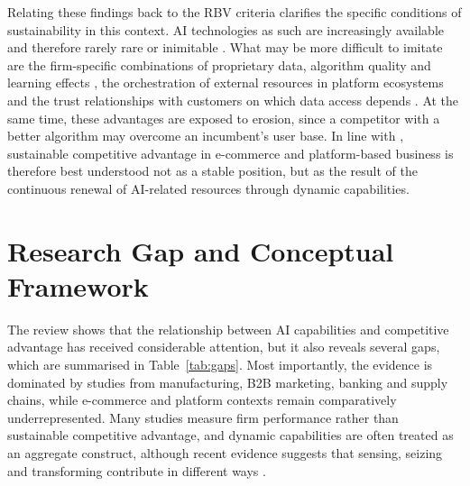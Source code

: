 Relating these findings back to the RBV criteria clarifies the specific conditions of sustainability in this context. AI technologies as such are increasingly available and therefore rarely rare or inimitable \parencite[583]{cui2024}. What may be more difficult to imitate are the firm-specific combinations of proprietary data, algorithm quality and learning effects \parencite[187]{chen2026}, the orchestration of external resources in platform ecosystems \parencite[451]{zeng2021} and the trust relationships with customers on which data access depends \parencite[1]{vu2026}. At the same time, these advantages are exposed to erosion, since a competitor with a better algorithm may overcome an incumbent's user base. In line with \textcite[509]{teece1997}, sustainable competitive advantage in e-commerce and platform-based business is therefore best understood not as a stable position, but as the result of the continuous renewal of AI-related resources through dynamic capabilities.

\section{Research Gap and Conceptual Framework}
\label{sec:framework}

The review shows that the relationship between AI capabilities and competitive advantage has received considerable attention, but it also reveals several gaps, which are summarised in Table~\ref{tab:gaps}. Most importantly, the evidence is dominated by studies from manufacturing, B2B marketing, banking and supply chains, while e-commerce and platform contexts remain comparatively underrepresented. Many studies measure firm performance rather than sustainable competitive advantage, and dynamic capabilities are often treated as an aggregate construct, although recent evidence suggests that sensing, seizing and transforming contribute in different ways \parencite[1]{huang2026}.

